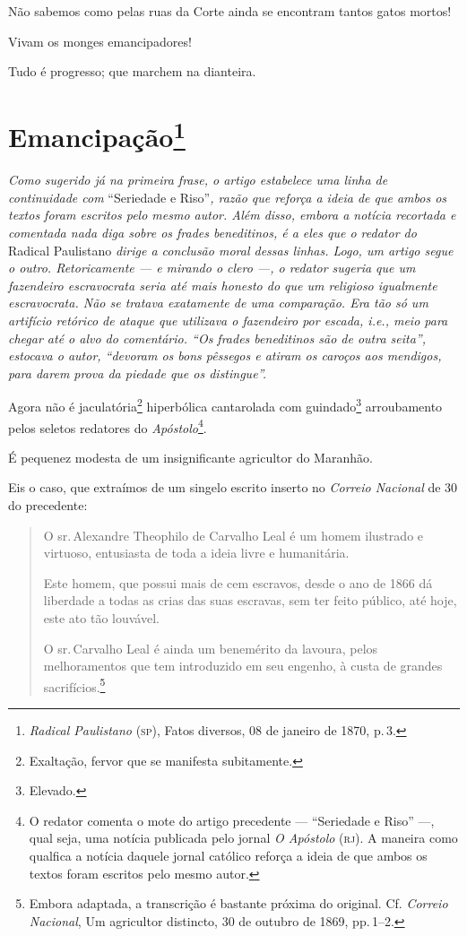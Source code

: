 Não sabemos como pelas ruas da Corte ainda se encontram tantos gatos
mortos!

Vivam os monges emancipadores!

Tudo é progresso; que marchem na dianteira.

\chapter{Emancipação\footnote{\emph{Radical Paulistano} (\textsc{sp}), Fatos diversos,
  08 de janeiro de 1870, p.\,3.}} %

\begin{didascalia}
\emph{Como sugerido já na primeira frase, o artigo estabelece uma linha
de continuidade com} ``Seriedade e Riso''\emph{, razão que reforça a ideia
de que ambos os textos foram escritos pelo mesmo autor. Além disso,
embora a notícia recortada e comentada nada diga sobre os frades
beneditinos, é a eles que o redator do} Radical Paulistano \emph{dirige
a conclusão moral dessas linhas. Logo, um artigo segue o outro.
Retoricamente --- e mirando o clero ---, o redator sugeria que um
fazendeiro escravocrata seria até mais honesto do que um religioso
igualmente escravocrata. Não se tratava exatamente de uma comparação.
Era tão só um artifício retórico de ataque que utilizava o fazendeiro
por escada, i.e., meio para chegar até o alvo do comentário. ``Os frades
beneditinos são de outra seita'', estocava o autor, ``devoram os bons
pêssegos e atiram os caroços aos mendigos, para darem prova da piedade
que os distingue''.}
\end{didascalia}


Agora não é jaculatória\footnote{ Exaltação, fervor que se manifesta
  subitamente.} hiperbólica cantarolada com guindado\footnote{ Elevado.}
arroubamento pelos seletos redatores do \emph{Apóstolo}\footnote{ O
  redator comenta o mote do artigo precedente --- ``Seriedade e Riso'' ---,
  qual seja, uma notícia publicada pelo jornal \emph{O Apóstolo} (\textsc{rj}). A
  maneira como qualfica a notícia daquele jornal católico reforça a
  ideia de que ambos os textos foram escritos pelo mesmo autor.}.

É pequenez modesta de um insignificante agricultor do Maranhão.

Eis o caso, que extraímos de um singelo escrito inserto no \emph{Correio
Nacional} de 30 do precedente:

\begin{quote}
O sr.\,Alexandre Theophilo de Carvalho Leal é um homem ilustrado e
virtuoso, entusiasta de toda a ideia livre e humanitária.

Este homem, que possui mais de cem escravos, desde o ano de 1866 dá
liberdade a todas as crias das suas escravas, sem ter feito público, até
hoje, este ato tão louvável.

O sr.\,Carvalho Leal é ainda um benemérito da lavoura, pelos
melhoramentos que tem introduzido em seu engenho, à custa de grandes
sacrifícios.\footnote{ Embora adaptada, a transcrição é bastante
  próxima do original. Cf. \emph{Correio Nacional}, Um agricultor
  distincto, 30 de outubro de 1869, pp.\,1--2.}
\end{quote}  

